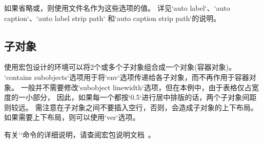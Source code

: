如果省略或，则使用文件名作为这些选项的值。
详见`auto label`、`auto caption`、`auto label strip path` 和`auto caption strip path`的说明。

\subsection{子对象}
\label{subobjects-2}
使用宏包设计的环境可以将2个或多个子对象组合成一个对象(容器对象)。
`contains subobjects`选项用于将`env`选项传递给各子对象，而不再作用于容器对象。
一般并不需要修改`subobject linewidth`选项，但在本例中，由于表格仅占宽度的一小部分，
因此，如果每一个都按`0.5\linewidth`进行居中排版的话，两个子对象间距则较远。
需注意在子对象之间不要插入空行，否则，会造成子对象的上下布局。
如果需要上下布局，则可以使用`ver`选项。

有关`\captionsetup`命令的详细说明，请查阅宏包说明文档~\autocite{caption}。


